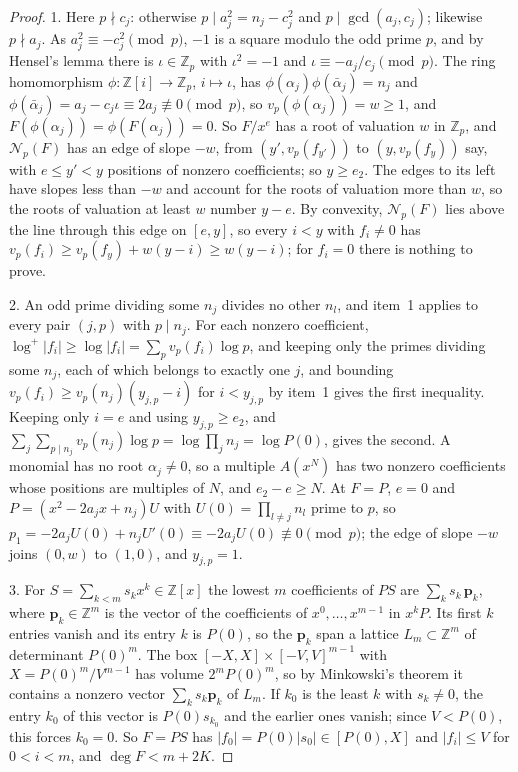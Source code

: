 \documentclass[11pt]{article}
\begin{document}
\begin{proof}
1.  Here $p\nmid c_j$: otherwise $p\mid a_j^2=n_j-c_j^2$ and $p\mid\gcd(a_j,c_j)$;
likewise $p\nmid a_j$.  As $a_j^2\equiv-c_j^2\pmod p$, $-1$ is a square modulo
the odd prime $p$, and by Hensel's lemma there is $\iota\in\mathbb Z_p$ with
$\iota^2=-1$ and $\iota\equiv-a_j/c_j\pmod p$.  The ring homomorphism
$\phi:\mathbb Z[i]\to\mathbb Z_p$, $i\mapsto\iota$, has
$\phi(\alpha_j)\phi(\bar\alpha_j)=n_j$ and
$\phi(\bar\alpha_j)=a_j-c_j\iota\equiv2a_j\not\equiv0\pmod p$, so
$v_p(\phi(\alpha_j))=w\ge1$, and $F(\phi(\alpha_j))=\phi(F(\alpha_j))=0$.  So
$F/x^e$ has a root of valuation $w$ in $\mathbb Z_p$, and $\mathcal N_p(F)$ has
an edge of slope $-w$, from $(y',v_p(f_{y'}))$ to $(y,v_p(f_y))$ say, with
$e\le y'<y$ positions of nonzero coefficients; so $y\ge e_2$.  The edges
to its left have slopes less than $-w$ and account for the roots of valuation
more than $w$, so the roots of valuation at least $w$ number $y-e$.  By
convexity, $\mathcal N_p(F)$ lies above the line through this edge on
$[e,y]$, so every $i<y$ with $f_i\ne0$ has
$v_p(f_i)\ge v_p(f_y)+w(y-i)\ge w(y-i)$; for $f_i=0$ there is nothing to
prove.

2.  An odd prime dividing some $n_j$ divides no other $n_l$, and item~1 applies
to every pair $(j,p)$ with $p\mid n_j$.  For each nonzero coefficient,
$\log^+|f_i|\ge\log|f_i|=\sum_pv_p(f_i)\log p$, and keeping only the primes
dividing some $n_j$, each of which belongs to exactly one $j$, and bounding
$v_p(f_i)\ge v_p(n_j)(y_{j,p}-i)$ for $i<y_{j,p}$ by item~1 gives the first
inequality.  Keeping only $i=e$ and using $y_{j,p}\ge e_2$, and
$\sum_j\sum_{p\mid n_j}v_p(n_j)\log p=\log\prod_jn_j=\log P(0)$, gives the
second.  A monomial has no root $\alpha_j\ne0$, so a multiple $A(x^N)$ has two
nonzero coefficients whose positions are multiples of $N$, and $e_2-e\ge N$.
At $F=P$, $e=0$ and $P=(x^2-2a_jx+n_j)U$ with $U(0)=\prod_{l\ne j}n_l$ prime to
$p$, so $p_1=-2a_jU(0)+n_jU'(0)\equiv-2a_jU(0)\not\equiv0\pmod p$; the edge of
slope $-w$ joins $(0,w)$ to $(1,0)$, and $y_{j,p}=1$.

3.  For $S=\sum_{k<m}s_kx^k\in\mathbb Z[x]$ the lowest $m$ coefficients of
$PS$ are $\sum_ks_k\,\mathbf p_k$, where $\mathbf p_k\in\mathbb Z^m$ is the
vector of the coefficients of $x^0,\ldots,x^{m-1}$ in $x^kP$.  Its first $k$
entries vanish and its entry $k$ is $P(0)$, so the $\mathbf p_k$ span a
lattice $L_m\subset\mathbb Z^m$ of determinant $P(0)^m$.  The box
$[-X,X]\times[-V,V]^{m-1}$ with $X=P(0)^m/V^{m-1}$ has volume $2^mP(0)^m$, so by
Minkowski's theorem it contains a nonzero vector $\sum_ks_k\mathbf p_k$ of
$L_m$.  If $k_0$ is the least $k$ with $s_k\ne0$, the entry $k_0$ of this
vector is $P(0)s_{k_0}$ and the earlier ones vanish; since $V<P(0)$, this
forces $k_0=0$.  So $F=PS$ has $|f_0|=P(0)|s_0|\in[P(0),X]$ and $|f_i|\le V$
for $0<i<m$, and $\deg F<m+2K$.
\end{proof}
\end{document}
